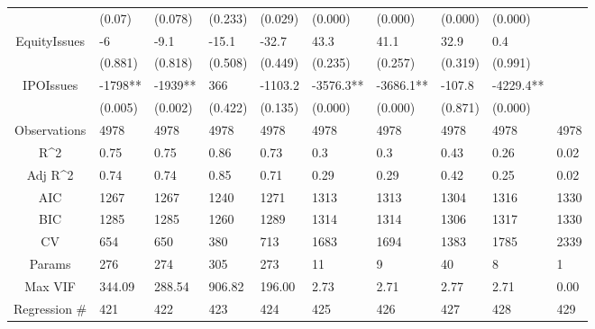 \documentclass{article}
\begin{document}
\begin{table}[H]
\begin{tabular}{|clllllllll|}
   & (0.07) & (0.078) & (0.233) & (0.029) & (0.000) & (0.000) & (0.000) & (0.000) &  \\ 
  EquityIssues & -6 & -9.1 & -15.1 & -32.7 & 43.3 & 41.1 & 32.9 & 0.4 &  \\ 
   & (0.881) & (0.818) & (0.508) & (0.449) & (0.235) & (0.257) & (0.319) & (0.991) &  \\ 
  IPOIssues & -1798** & -1939** & 366 & -1103.2 & -3576.3** & -3686.1** & -107.8 & -4229.4** &  \\ 
   & (0.005) & (0.002) & (0.422) & (0.135) & (0.000) & (0.000) & (0.871) & (0.000) &  \\ 
  \hline 
 Observations & 4978 & 4978 & 4978 & 4978 & 4978 & 4978 & 4978 & 4978 & 4978 \\ 
  R^2 & 0.75 & 0.75 & 0.86 & 0.73 & 0.3 & 0.3 & 0.43 & 0.26 & 0.02 \\ 
  Adj R^2 & 0.74 & 0.74 & 0.85 & 0.71 & 0.29 & 0.29 & 0.42 & 0.25 & 0.02 \\ 
  AIC & 1267 & 1267 & 1240 & 1271 & 1313 & 1313 & 1304 & 1316 & 1330 \\ 
  BIC & 1285 & 1285 & 1260 & 1289 & 1314 & 1314 & 1306 & 1317 & 1330 \\ 
  CV & 654 & 650 & 380 & 713 & 1683 & 1694 & 1383 & 1785 & 2339 \\ 
  Params & 276 & 274 & 305 & 273 & 11 & 9 & 40 & 8 & 1 \\ 
  Max VIF & 344.09 & 288.54 & 906.82 & 196.00 & 2.73 & 2.71 & 2.77 & 2.71 & 0.00 \\ 
  Regression \# & 421 & 422 & 423 & 424 & 425 & 426 & 427 & 428 & 429 \\ 
   \hline
\end{tabular}
 
\end{table}
\end{document}
